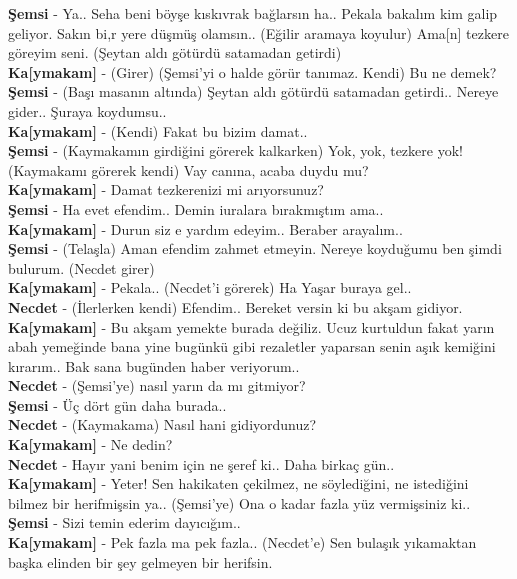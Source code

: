 \documentclass[]{book}
\begin{document}
\textbf{Şemsi} - Ya.. Seha beni böyşe kıskıvrak bağlarsın ha.. Pekala bakalım kim galip geliyor. Sakın bi,r yere düşmüş olamsın.. (Eğilir aramaya koyulur) Ama{[}n{]} tezkere göreyim seni. (Şeytan aldı götürdü satamadan getirdi)\\
\textbf{Ka{[}ymakam{]}} - (Girer) (Şemsi'yi o halde görür tanımaz. Kendi) Bu ne demek?\\
\textbf{Şemsi} - (Başı masanın altında) Şeytan aldı götürdü satamadan getirdi.. Nereye gider.. Şuraya koydumsu..\\
\textbf{Ka{[}ymakam{]}} - (Kendi) Fakat bu bizim damat..\\
\textbf{Şemsi} - (Kaymakamın girdiğini görerek kalkarken) Yok, yok, tezkere yok! (Kaymakamı görerek kendi) Vay canına, acaba duydu mu?\\
\textbf{Ka{[}ymakam{]}} - Damat tezkerenizi mi arıyorsunuz?\\
\textbf{Şemsi} - Ha evet efendim.. Demin iuralara bırakmıştım ama..\\
\textbf{Ka{[}ymakam{]}} - Durun siz e yardım edeyim.. Beraber arayalım..\\
\textbf{Şemsi} - (Telaşla) Aman efendim zahmet etmeyin. Nereye koyduğumu ben şimdi bulurum. (Necdet girer)\\
\textbf{Ka{[}ymakam{]}} - Pekala.. (Necdet'i görerek) Ha Yaşar buraya gel..\\
\textbf{Necdet} - (İlerlerken kendi) Efendim.. Bereket versin ki bu akşam gidiyor.\\
\textbf{Ka{[}ymakam{]}} - Bu akşam yemekte burada değiliz. Ucuz kurtuldun fakat yarın abah yemeğinde bana yine bugünkü gibi rezaletler yaparsan senin aşık kemiğini kırarım.. Bak sana bugünden haber veriyorum..\\
\textbf{Necdet} - (Şemsi'ye) nasıl yarın da mı gitmiyor?\\
\textbf{Şemsi} - Üç dört gün daha burada..\\
\textbf{Necdet} - (Kaymakama) Nasıl hani gidiyordunuz?\\
\textbf{Ka{[}ymakam{]}} - Ne dedin?\\
\textbf{Necdet} - Hayır yani benim için ne şeref ki.. Daha birkaç gün..\\
\textbf{Ka{[}ymakam{]}} - Yeter! Sen hakikaten çekilmez, ne söylediğini, ne istediğini bilmez bir herifmişsin ya.. (Şemsi'ye) Ona o kadar fazla yüz vermişsiniz ki..\\
\textbf{Şemsi} - Sizi temin ederim dayıcığım..\\
\textbf{Ka{[}ymakam{]}} - Pek fazla ma pek fazla.. (Necdet'e) Sen bulaşık yıkamaktan başka elinden bir şey gelmeyen bir herifsin.\\
\end{document}
